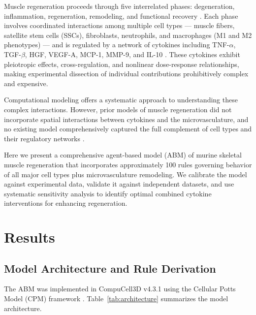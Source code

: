 \documentclass[11pt]{article}
\begin{document}
Muscle regeneration proceeds through five interrelated phases: degeneration, inflammation, regeneration, remodeling, and functional recovery \citep{tidball2005inflammatory, chargecluster2019agent}. Each phase involves coordinated interactions among multiple cell types --- muscle fibers, satellite stem cells (SSCs), fibroblasts, neutrophils, and macrophages (M1 and M2 phenotypes) --- and is regulated by a network of cytokines including TNF-$\alpha$, TGF-$\beta$, HGF, VEGF-A, MCP-1, MMP-9, and IL-10 \citep{wosczyna2018mesenchymal, dort2019macrophages}. These cytokines exhibit pleiotropic effects, cross-regulation, and nonlinear dose-response relationships, making experimental dissection of individual contributions prohibitively complex and expensive.

Computational modeling offers a systematic approach to understanding these complex interactions. However, prior models of muscle regeneration did not incorporate spatial interactions between cytokines and the microvasculature, and no existing model comprehensively captured the full complement of cell types and their regulatory networks \citep{swat2012multi}.

Here we present a comprehensive agent-based model (ABM) of murine skeletal muscle regeneration that incorporates approximately 100 rules governing behavior of all major cell types plus microvasculature remodeling. We calibrate the model against experimental data, validate it against independent datasets, and use systematic sensitivity analysis to identify optimal combined cytokine interventions for enhancing regeneration.

\section{Results}

\subsection{Model Architecture and Rule Derivation}

The ABM was implemented in CompuCell3D v4.3.1 using the Cellular Potts Model (CPM) framework \citep{graner1992simulation, swat2012multi}. Table~\ref{tab:architecture} summarizes the model architecture.
\end{document}
